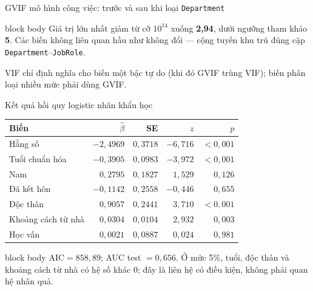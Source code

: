 \documentclass[10pt,aspectratio=169]{beamer}
\begin{document}
\begin{frame}{GVIF mô hình công việc: trước và sau khi loại \texttt{Department}}
  \vspace{0.20cm}
  \begin{beamercolorbox}[sep=0.14cm,rounded=true]{block body}
    \centering\small
    Giá trị lớn nhất giảm từ cỡ $10^{14}$ xuống \textbf{2,94}, dưới ngưỡng
    tham khảo \textbf{5}. Các biến không liên quan hầu như không đổi ---
    cộng tuyến khu trú đúng cặp \texttt{Department}--\texttt{JobRole}.
  \end{beamercolorbox}
  \vspace{0.10cm}
  {\scriptsize\color{MutedText}
   \centering VIF chỉ định nghĩa cho biến một bậc tự do (khi đó GVIF trùng
   VIF); biến phân loại nhiều mức phải dùng GVIF.\par}
\end{frame}


\begin{frame}{Kết quả hồi quy logistic nhân khẩu học}
  \centering\scriptsize
  \renewcommand{\arraystretch}{1.16}
  \begin{tabular}{lrrrr}
    \toprule
    \textbf{Biến} & $\hat\beta$ & \textbf{SE} & $z$ & $p$\\
    \midrule
    Hằng số & $-2{,}4969$ & $0{,}3718$ & $-6{,}716$ & $<0{,}001$\\
    Tuổi chuẩn hóa & $-0{,}3905$ & $0{,}0983$ & $-3{,}972$ & $<0{,}001$\\
    Nam & $0{,}2795$ & $0{,}1827$ & $1{,}529$ & $0{,}126$\\
    Đã kết hôn & $-0{,}1142$ & $0{,}2558$ & $-0{,}446$ & $0{,}655$\\
    Độc thân & $0{,}9057$ & $0{,}2441$ & $3{,}710$ & $<0{,}001$\\
    Khoảng cách từ nhà & $0{,}0304$ & $0{,}0104$ & $2{,}932$ & $0{,}003$\\
    Học vấn & $0{,}0021$ & $0{,}0887$ & $0{,}024$ & $0{,}981$\\
    \bottomrule
  \end{tabular}
  \vspace{0.28cm}
  \begin{beamercolorbox}[sep=0.14cm,rounded=true]{block body}
    \small
    $\mathrm{AIC}=858{,}89$; AUC test $=0{,}656$.
    Ở mức 5\%, tuổi, độc thân và khoảng cách từ nhà có hệ số khác 0;
    đây là liên hệ có điều kiện, không phải quan hệ nhân quả.
  \end{beamercolorbox}
\end{frame}
\end{document}
